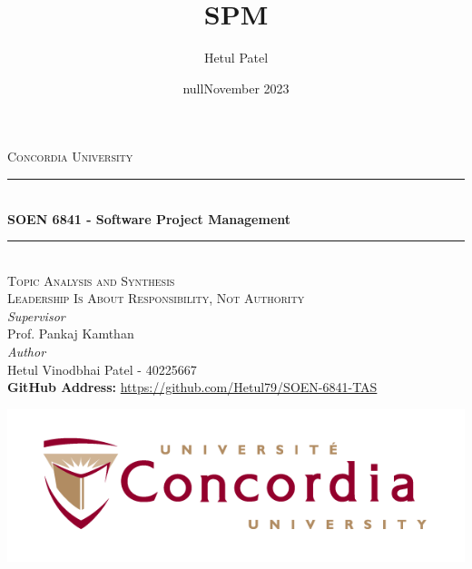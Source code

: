 \documentclass[a4paper,12pt]{report}
\date{null}
\title{SPM}
\author{Hetul Patel}
\date{November 2023}
\begin{document}
\begin{titlepage} %
	\newcommand{\HRule}{\rule{\linewidth}{0.5mm}} %
	
	\center %
	
	
	\textsc{\LARGE Concordia University}\\[1.5cm] %
	

	
	\HRule\\[0.4cm]
	
	{\huge\bfseries  SOEN 6841 - Software Project Management}\\[0.4cm] %
	
	\HRule\\[1.5cm]
	\textsc{\Large Topic Analysis and Synthesis}\\[0.5cm] %
	\textsc{\Large Leadership Is About Responsibility, Not Authority}\\[0.5cm]
	
			\large
			\textit{Supervisor}\\
			Prof. Pankaj Kamthan\\[0.5cm] %
    \vfill
    \large
			\textit{Author}\\
            Hetul Vinodbhai Patel - \textsc{40225667}\\
            
	
	\vfill\vfill\vfill\vfill%
	\textbf{GitHub Address:} \url{https://github.com/Hetul79/SOEN-6841-TAS}

	
 	\vfill\vfill
 	\includegraphics[scale=0.5]{concordia-logo.png}\\[1cm] %
	 

\end{titlepage}
\end{document}
